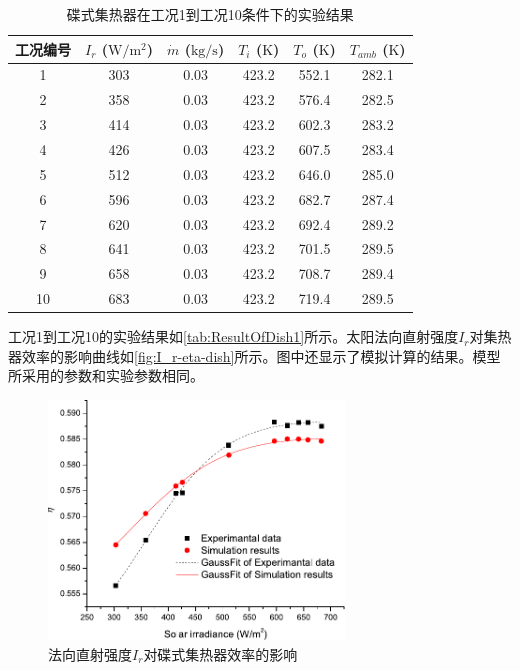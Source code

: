 \begin{table}[htbp]
\setlength{\abovecaptionskip}{0pt}
	\caption{碟式集热器在工况1到工况10条件下的实验结果}
	\centering
	\begin{tabular}{cccccc}
		\toprule
		工况编号	& $I_r$ ($\mathrm{W/m^2}$)	&	$\dot{m}$ ($\mathrm{kg/s}$)			&	$T_i$ ($\mathrm{K}$)	&	$T_o$ ($\mathrm{K}$)		&	$T_{amb}$ ($\mathrm{K}$)\\
		\midrule
		1	&	303	&	0.03	&	423.2	&	552.1	&	282.1\\
		2	&	358	&	0.03	&	423.2	&	576.4	&	282.5\\
		3	&	414	&	0.03	&	423.2	&	602.3	&	283.2	\\
		4	&	426	&	0.03	&	423.2	&	607.5	&	283.4\\
		5	&	512	&	0.03	&	423.2	&	646.0	&	285.0\\
		6	&	596	&	0.03	&	423.2	&	682.7	&	287.4\\
		7	&	620	&	0.03	&	423.2	&	692.4	&	289.2\\
		8	&	641	&	0.03	&	423.2	&	701.5	&	289.5\\
		9	&	658	&	0.03	&	423.2	&	708.7	&	289.4\\
		10	&	683	&	0.03	&	423.2	&	719.4	&	289.5\\
		\bottomrule
	\end{tabular}
	\label{tab:ResultOfDish1}
\end{table}
工况1到工况10的实验结果如\autoref{tab:ResultOfDish1}所示。太阳法向直射强度$I_r$对集热器效率的影响曲线如\autoref{fig:I_r-eta-dish}所示。图中还显示了模拟计算的结果。模型所采用的参数和实验参数相同。
\begin{figure}[ht!]
\centering
\includegraphics[width=0.7\textwidth]{fig/I_r-eta-dish}
\caption{法向直射强度$I_r$对碟式集热器效率的影响}
\label{fig:I_r-eta-dish}
\end{figure}

